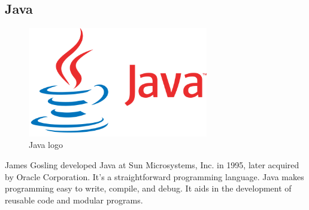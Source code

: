 

\subsection{Java}

\begin{figure}[H]
	\centering
	\includegraphics[width=0.7\textwidth]{img/technology/java.png}
	\caption{Java logo}
	\label{fig:JavaLogo}
\end{figure}

James Gosling developed Java at Sun Microsystems, Inc. in 1995, later acquired by Oracle Corporation. It's a straightforward programming language. Java makes programming easy to write, compile, and debug. It aids in the development of reusable code and modular programs.

